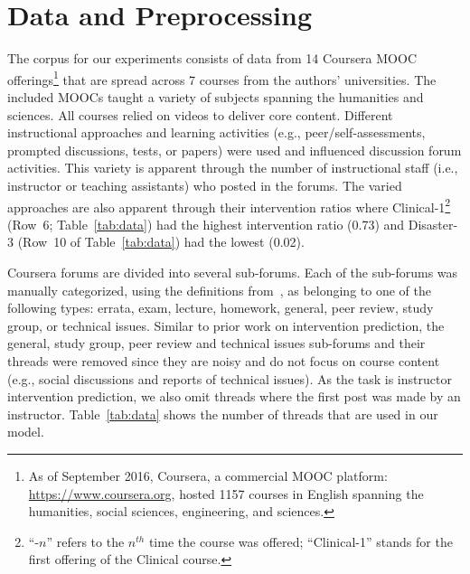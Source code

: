 \documentclass[letterpaper]{article}
\begin{document}

\section{Data and Preprocessing}
\label{sect:data}

The corpus for our experiments consists of data from 14 Coursera MOOC
offerings\footnote{As of September 2016, Coursera, a commercial MOOC
  platform: \url{https://www.coursera.org}, hosted 1157 courses in
  English spanning the humanities, social sciences, engineering, and
  sciences.} that are spread across 7 courses from the authors'
universities. The included MOOCs taught a variety of subjects spanning
the humanities and sciences. All courses relied on videos to deliver
core content. Different instructional approaches and learning
activities (e.g., peer/self-assessments, prompted discussions, tests,
or papers) were used and influenced discussion forum activities. This
variety is apparent through the number of instructional staff (i.e.,
instructor or teaching assistants) who posted in the forums.  The
varied approaches are also apparent through their intervention ratios
where {\sc Clinical-1}\footnote{``-$n$'' refers to the $n^{th}$ time
  the course was offered; ``{\sc Clinical-1}'' stands for the first
  offering of the Clinical course.} (Row~6; Table~\ref{tab:data}) had
the highest intervention ratio (0.73) and {\sc Disaster-3} (Row~10 of
Table~\ref{tab:data}) had the lowest (0.02).




Coursera forums are divided into several sub-forums. Each of the sub-forums was 
manually categorized, using the definitions  
from~\cite{chandrasekaran2015learning}, as belonging to one of the following 
types: errata, exam, lecture, homework, general, peer review, study group, or 
technical issues. Similar to prior work on intervention prediction, the general, 
study group, peer review  and technical issues sub-forums and their threads were 
removed since they are noisy and do not focus on course content (e.g., social discussions and reports of 
technical issues). As the task is instructor intervention prediction, we also omit threads where the first post was made by an 
instructor. Table~\ref{tab:data} shows the number of threads that 
are used in our model.
\end{document}

